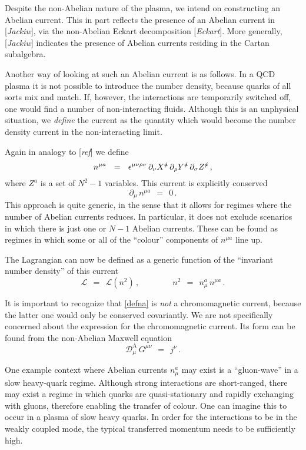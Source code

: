 \documentclass[epsfig,12pt]{article}
\def\beq{\begin{equation}}
\def\eeq{\end{equation}}
\newcommand{\p}{\partial}
\newcommand{\mc}[1]{\mathcal{#1}}
\newcommand{\md}{\mathcal{D}}
\begin{document}
	Despite the non-Abelian nature of the plasma, we intend on constructing an Abelian current.
        This in part reflects the presence of an Abelian current in [{\it Jackiw}], via the non-Abelian Eckart decomposition [{\it Eckart}].
	More generally, [{\it Jackiw}] indicates the presence of Abelian currents residing in the Cartan subalgebra.

	Another way of looking at such an Abelian current is as follows.
	In a QCD plasma it is not possible to introduce the number density, because quarks of all sorts
	mix and match.
	If, however, the interactions are temporarily switched off, one would find a number of non-interacting fluids.
	Although this is an unphysical situation, we \emph{define} the current as the quantity which would
        become the number density current in the non-interacting limit.

	Again in analogy to [{\it ref}] we define
\beq
\label{defna}
	n^{\mu a}    ~~=~~    \epsilon^{\mu\nu\rho\sigma}\, \p_\nu X^\slashed{a}\, \p_\rho Y^\slashed{a}\, \p_\sigma Z^\slashed{a}\,,
\eeq
	where $ Z^a $ is a set of $ N^2 - 1 $ variables.
	This current is explicitly conserved
\beq
\label{ncont}
	\p_\mu\, n^{\mu a}    ~~=~~    0\,.
\eeq
	This approach is quite generic, in the sense that it allows for regimes where the number of Abelian
	currents reduces.
	In particular, it does not exclude scenarios in which there is just one or $ N - 1 $ Abelian currents.
	These can be found as regimes in which some or all of the ``colour'' components of $ n^{\mu a} $ line up.

	The Lagrangian can now be defined as a generic function of the ``invariant number density'' of this current
\beq
	\mc{L}    ~~=~~    \mc{L}(n^2)\,,
        \qquad\qquad
        n^2 ~~=~~ n_\mu^a\, n^{\mu a}\,.
\eeq

	It is important to recognize that \eqref{defna} is \emph{not} a chromomagnetic current,
        because the latter one would only be conserved covariantly.
	We are not specifically concerned about the expression for the chromomagnetic current.
	Its form can be found from the non-Abelian Maxwell equation
\beq
\label{na_maxwell}
	\md^\text{A}_\mu\, G^{\mu\nu}     ~~=~~    j^\nu\,.
\eeq

	One example context where Abelian currents $ n^a_\mu $ may exist is a ``gluon-wave'' in a slow heavy-quark regime.
        Although strong interactions are short-ranged, there may exist a regime in which quarks are quasi-stationary
        and rapidly exchanging with gluons, therefore enabling the transfer of colour.
        One can imagine this to occur in a plasma of slow heavy quarks.
        In order for the interactions to be in the weakly coupled mode, the typical transferred momentum needs to be sufficiently high.
\end{document}
